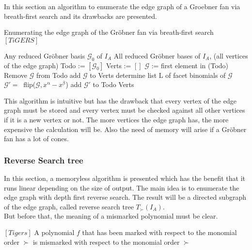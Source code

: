 In this section an algorithm to enumerate the edge graph of a Groebner fan via breath-first search and its drawbacks are presented.

\begin{algorithm}
\caption{Enumerating the edge graph of the Gröbner fan via breath-first search $\left[ TiGERS\right]  $}
\label{breadth-alg}
\begin{algorithmic}[1]

\Require
Any reduced Gröbner basis $ \mathcal{G}_0 $ of $I_A$
\Ensure All reduced Gröbner bases of $I_A$, (all vertices of the edge graph)
\State Todo := $\left[ \mathcal{G}_0 \right]  $
\State Verts := $\left[ \right] $
\State $\mathcal{G}$ := first element in (Todo)
\State Remove $\mathcal{G} $ from Todo
\State add $\mathcal{G}$ to Verts 
\State determine list L of facet binomials of $\mathcal{G} $
 \State $\mathcal{G}' =~$ flip($\mathcal{G},x^{\upalpha} - x^{\upbeta} $)
 \State add $\mathcal{G}'$ to Todo
 \EndIf
 \EndFor
\EndWhile 
\Return Verts

\end{algorithmic}
\end{algorithm}

This algorithm is intuitive but has the drawback that every vertex of the edge graph must be stored and every vertex must be checked against all other vertices if it is a new vertex or not. 
The more vertices the edge graph has, the more expensive the calculation will be. Also the need of memory will arise if a Gröbner fan has a lot of cones.
 

\subsubsection{Reverse Search tree}
In this section, a memoryless algorithm is presented which has the benefit that it runs linear depending on the size of output. The main idea is to enumerate the edge graph with depth first reverse search. The result will be a directed subgraph of the edge graph, called reverse search tree $T_{\succ}(I_{A}) $.\\
But before that, the meaning of a mismarked polynomial must be clear.
\begin{env_definition}
$\left[Tigers \right]  $
A polynomial $f$ that has been marked with respect to the monomial order $\succ$  is mismarked with respect to the monomial order $\succ$  
\end{env_definition}



